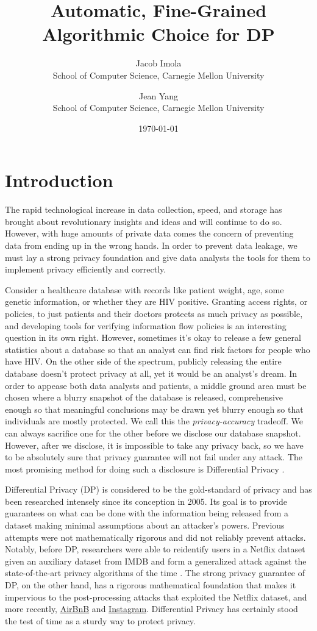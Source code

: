 \documentclass[11pt]{article}
\title{Automatic, Fine-Grained Algorithmic Choice for DP}
\date{\today}
\author{Jacob Imola\\ School of Computer Science, Carnegie Mellon University\and Jean Yang\\ School of Computer Science, Carnegie Mellon University}
\begin{document}
\maketitle
\section{Introduction}
The rapid technological increase in data collection, speed, and storage has brought about revolutionary insights and ideas and will continue to do so. However, with huge amounts of private data comes the concern of preventing data from ending up in the wrong hands. In order to prevent data leakage, we must lay a strong privacy foundation and give data analysts the tools for them to implement privacy efficiently and correctly.

Consider a healthcare database with records like patient weight, age, some genetic information, or whether they are HIV positive. Granting access rights, or policies, to just patients and their doctors protects as much privacy as possible, and developing tools for verifying information flow policies is an interesting question in its own right. However, sometimes it's okay to release a few general statistics about a database so that an analyst can find risk factors for people who have HIV. On the other side of the spectrum, publicly releasing the entire database doesn't protect privacy at all, yet it would be an analyst's dream. In order to appease both data analysts and patients, a middle ground area must be chosen where a blurry snapshot of the database is released, comprehensive enough so that meaningful conclusions may be drawn yet blurry enough so that individuals are mostly protected. We call this the \emph{privacy-accuracy} tradeoff. We can always sacrifice one for the other before we disclose our database snapshot. However, after we disclose, it is impossible to take any privacy back, so we have to be absolutely sure that privacy guarantee will not fail under any attack. The most promising method for doing such a disclosure is Differential Privacy \cite{Dwork:2006}.

Differential Privacy (DP) is considered to be the gold-standard of privacy and has been researched intensely since its conception in 2005. Its goal is to provide guarantees on what can be done with the information being released from a dataset making minimal assumptions about an attacker's powers. Previous attempts were not mathematically rigorous and did not reliably prevent attacks. Notably, before DP, researchers were able to reidentify users in a Netflix dataset given an auxiliary dataset from IMDB and form a generalized attack against the state-of-the-art privacy algorithms of the time \cite{Narayanan:2006}. The strong privacy guarantee of DP, on the other hand, has a rigorous mathematical foundation that makes it impervious to the post-processing attacks that exploited the Netflix dataset, and more recently, \href{https://hackernoon.com/how-to-rob-an-airbnb-252e7e7eda44}{AirBnB} and \href{https://gizmodo.com/this-is-almost-certainly-james-comey-s-twitter-account-1793843641}{Instagram}. Differential Privacy has certainly stood the test of time as a sturdy way to protect privacy.
\end{document}
